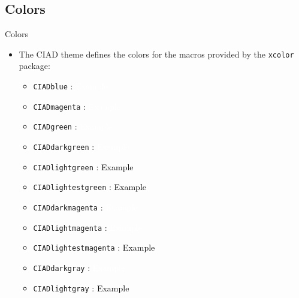\documentclass[english,sectioncirclenumberstyle]{ciadbeamer}
\begin{document}
\subsection{Colors}

\begin{frame}{Colors}
	\begin{itemize}
	\item The CIAD theme defines the colors for the macros provided by the \texttt{xcolor} package:
		\begin{itemize}
		\item \texttt{CIADblue} : \fbox{\textcolor{CIADblue}{Example}} \colorbox{CIADblue}{\textcolor{white}{Example}}
		\vfill
		\item \texttt{CIADmagenta} : \fbox{\textcolor{CIADmagenta}{Example}} \colorbox{CIADmagenta}{\textcolor{white}{Example}}
		\vfill
		\item \texttt{CIADgreen} : \fbox{\textcolor{CIADgreen}{Example}} \colorbox{CIADgreen}{\textcolor{white}{Example}}
		\vfill
		\item \texttt{CIADdarkgreen} : \fbox{\textcolor{CIADdarkgreen}{Example}} \colorbox{CIADdarkgreen}{\textcolor{white}{Example}}
		\vfill
		\item \texttt{CIADlightgreen} : \fbox{\textcolor{CIADlightgreen}{Example}} \colorbox{CIADlightgreen}{\textcolor{black}{Example}}
		\vfill
		\item \texttt{CIADlightestgreen} : \fbox{\textcolor{CIADlightestgreen}{Example}} \colorbox{CIADlightestgreen}{\textcolor{black}{Example}}
		\vfill
		\item \texttt{CIADdarkmagenta} : \fbox{\textcolor{CIADdarkmagenta}{Example}} \colorbox{CIADdarkmagenta}{\textcolor{white}{Example}}
		\vfill
		\item \texttt{CIADlightmagenta} : \fbox{\textcolor{CIADlightmagenta}{Example}} \colorbox{CIADlightmagenta}{\textcolor{white}{Example}}
		\vfill
		\item \texttt{CIADlightestmagenta} : \fbox{\textcolor{CIADlightestmagenta}{Example}} \colorbox{CIADlightestmagenta}{\textcolor{black}{Example}}
		\vfill
		\item \texttt{CIADdarkgray} : \fbox{\textcolor{CIADdarkgray}{Example}} \colorbox{CIADdarkgray}{\textcolor{white}{Example}}
		\vfill
		\item \texttt{CIADlightgray} : \fbox{\textcolor{CIADlightgray}{Example}} \colorbox{CIADlightgray}{\textcolor{black}{Example}}
		\end{itemize}
	\end{itemize}
\end{frame}
\end{document}
